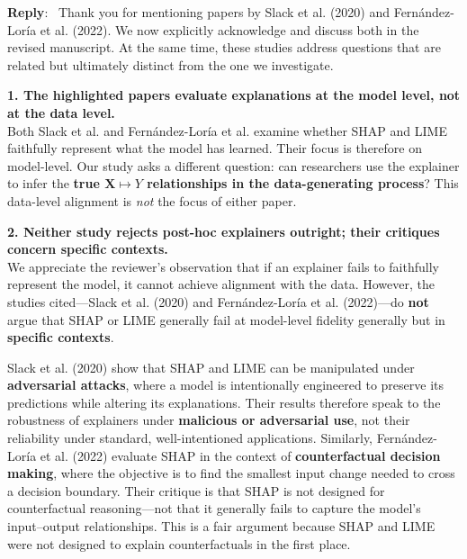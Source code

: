 \documentclass[11pt]{article}
\newcounter{se}[section]
\newcounter{reviewer}
\newenvironment{reply}
 {\par\medskip \noindent \begin{sf}\textbf{Reply}:\ }
 {\medskip \end{sf}}
\begin{document}
\begin{reply} Thank you for mentioning papers by Slack et al. (2020) and Fernández-Loría et al. (2022). We now explicitly acknowledge and discuss both in the revised manuscript. At the same time, these studies address questions that are related but ultimately distinct from the one we investigate.

\noindent\textbf{1. The highlighted papers evaluate explanations at the model level, not at the data level.}\\
Both Slack et al. and Fernández-Loría et al. examine whether SHAP and LIME faithfully represent what the model has learned. Their focus is therefore on model-level. Our study asks a different question: can researchers use the explainer to infer the \textbf{true $\mathbf{X} \mapsto Y$ relationships in the data-generating process}? This data-level alignment is \textit{not} the focus of either paper.


\noindent\textbf{2. Neither study rejects post-hoc explainers outright; their critiques concern specific contexts.}\\
We appreciate the reviewer’s observation that if an explainer fails to faithfully represent the model, it cannot achieve alignment with the data.  However, the studies cited—Slack et al. (2020) and Fernández-Loría et al. (2022)—do \textbf{not} argue that SHAP or LIME generally fail at model-level fidelity generally but in \textbf{specific contexts}.

Slack et al. (2020) show that SHAP and LIME can be manipulated under \textbf{adversarial attacks}, where a model is intentionally engineered to preserve its predictions while altering its explanations. Their results therefore speak to the robustness of explainers under \textbf{malicious or adversarial use}, not their reliability under standard, well-intentioned applications. Similarly, Fernández-Loría et al. (2022) evaluate SHAP in the context of\textbf{ counterfactual decision making}, where the objective is to find the smallest input change needed to cross a decision boundary. Their critique is that SHAP is not designed for counterfactual reasoning—not that it generally fails to capture the model’s input–output relationships. This is a fair argument because SHAP and LIME were not designed to explain counterfactuals in the first place. 



\end{reply}
\end{document}
